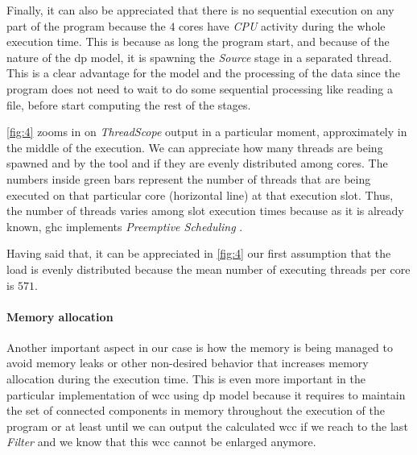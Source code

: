 \documentclass[preprint]{elsarticle}
\begin{document}
Finally, it can also be appreciated that there is no sequential execution on any part of the program because the $4$ cores have \textit{CPU} activity during the whole execution time. This is because as long the program start, and because of the nature of the \acrshort{dp} model, it is spawning the \textit{Source} stage in a separated thread. This is a clear advantage for the model and the processing of the data since the program does not need to wait to do some sequential processing like reading a file, before start computing the rest of the stages.





\autoref{fig:4} zooms in on \textit{ThreadScope} output in a particular moment, approximately in the middle of the execution. We can appreciate how many threads are being spawned and by the tool and if they are evenly distributed among cores. The numbers inside green bars represent the number of threads that are being executed on that particular core (horizontal line) at that execution slot. Thus, the number of threads varies among slot execution times because as it is already known, \acrshort{ghc} implements \emph{Preemptive Scheduling} \cite{lightweightghc}.

Having said that, it can be appreciated in \autoref{fig:4} our first assumption that the load is evenly distributed because the mean number of executing threads per core is $571$.

\paragraph{Memory allocation} Another important aspect in our case is how the memory is being managed to avoid memory leaks or other non-desired behavior that increases memory allocation during the execution time. This is even more important in the particular implementation of \acrshort{wcc} using \acrshort{dp} model because it requires to maintain the set of connected components in memory throughout the execution of the program or at least until we can output the calculated \acrshort{wcc} if we reach to the last \textit{Filter} and we know that this \acrshort{wcc} cannot be enlarged anymore. 
\end{document}
